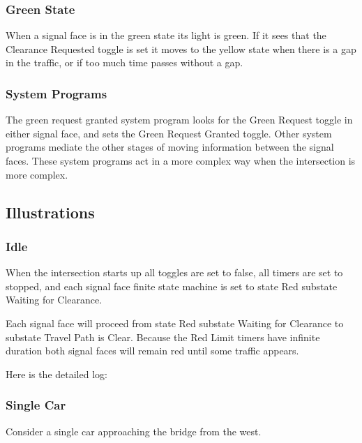 \documentclass[letterpaper,twoside]{article}
\begin{document}
\subsubsection{Green State}
When a signal face is in the green state its light is green.
If it sees that the Clearance Requested toggle is set it moves to the
yellow state when there is a gap in the traffic, or if too much time
passes without a gap.

\subsubsection{System Programs}

The green request granted system program looks for the Green Request
toggle in either signal face, and sets the Green Request Granted
toggle.  Other system programs mediate the other stages of moving
information between the signal faces.  These system programs act
in a more complex way when the intersection is more complex.

\subsection{Illustrations}

\subsubsection{Idle}

When the intersection starts up all toggles are set to false,
all timers are set to stopped, and each signal face finite state machine
is set to state Red substate Waiting for Clearance.

Each signal face will proceed
from state Red substate Waiting for Clearance to substate Travel Path is Clear.
Because the Red Limit timers have infinite duration both signal faces
will remain red until some traffic appears.

Here is the detailed log:



\subsubsection{Single Car}

Consider a single car approaching the bridge from the west.

\noindent{}
\end{document}
